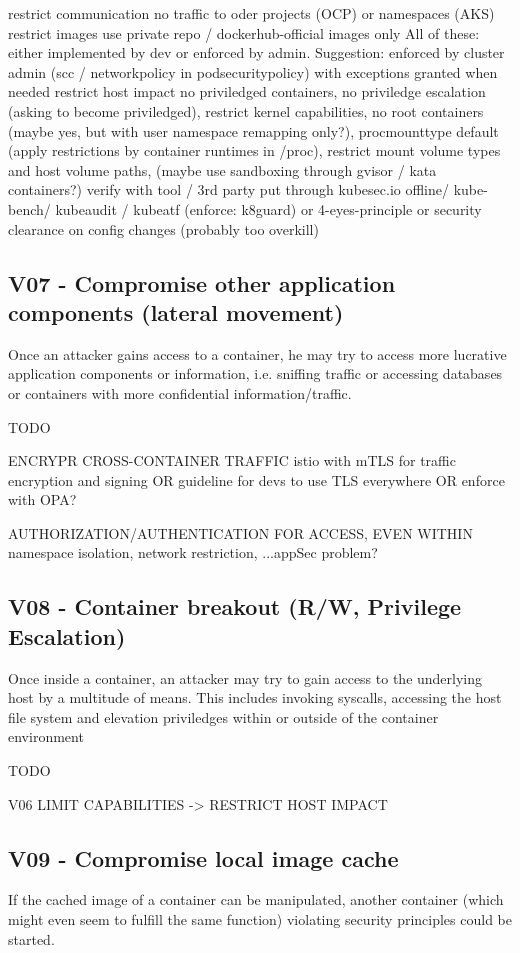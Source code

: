 	restrict communication			no traffic to oder projects (OCP) or namespaces (AKS)						
	restrict images			use private repo / dockerhub-official images only						All of these: either implemented by dev or enforced by admin. Suggestion: enforced by cluster admin (scc / networkpolicy in podsecuritypolicy) with exceptions granted when needed
	restrict host impact			no priviledged containers, no priviledge escalation (asking to become priviledged), restrict kernel capabilities, no root containers (maybe yes, but with user namespace remapping only?), procmounttype default (apply restrictions by container runtimes in /proc), restrict mount volume types and host volume paths, (maybe use sandboxing through gvisor / kata containers?)						
	verify with tool / 3rd party			put through kubesec.io offline/ kube-bench/ kubeaudit / kubeatf (enforce: k8guard) or 4-eyes-principle or security clearance on config changes (probably too overkill)						


\subsection{V07 - Compromise other application components (lateral movement)}
Once an attacker gains access to a container, he may try to access more lucrative application components or information, i.e. sniffing traffic or accessing databases or containers with more confidential information/traffic.

TODO

ENCRYPR CROSS-CONTAINER TRAFFIC
	istio with mTLS for traffic encryption and signing OR guideline for devs to use TLS everywhere OR enforce with OPA?		
			
AUTHORIZATION/AUTHENTICATION FOR ACCESS, EVEN WITHIN
	namespace isolation, network restriction, ...appSec problem?

\subsection{V08 - Container breakout (R/W, Privilege Escalation)}
Once inside a container, an attacker may try to gain access to the underlying host by a multitude of means. This includes invoking syscalls, accessing the host file system and elevation priviledges within or outside of the container environment

TODO

V06 LIMIT CAPABILITIES -> RESTRICT HOST IMPACT

\subsection{V09 - Compromise local image cache}
If the cached image of a container can be manipulated, another container (which might even seem to fulfill the same function) violating security principles could be started.


